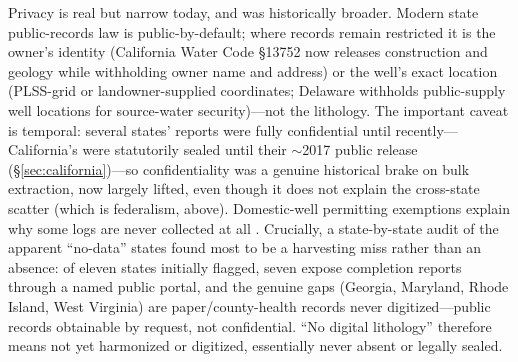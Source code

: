 \documentclass[12pt]{article}
\begin{document}
Privacy is real but narrow today, and was historically broader. Modern state public-records law is
public-by-default; where records remain restricted it is the owner's identity (California Water Code
\S13752 now releases construction and geology while withholding owner name and address) or the well's
exact location (PLSS-grid or landowner-supplied coordinates; Delaware withholds public-supply well
locations for source-water security)---not the lithology. The important caveat is temporal: several states'
reports were fully confidential until recently---California's were statutorily sealed until their
$\sim$2017 public release (§\ref{sec:california})---so confidentiality was a genuine historical brake
on bulk extraction, now largely lifted, even though it does not explain the cross-state scatter
(which is federalism, above). Domestic-well permitting exemptions explain why some logs are never collected at all
\citep{maxwell2019}. Crucially, a state-by-state audit of the apparent ``no-data'' states found most to be a
harvesting miss rather than an absence: of eleven states initially flagged, seven expose completion reports
through a named public portal, and the genuine gaps (Georgia, Maryland, Rhode Island, West Virginia) are
paper/county-health records never digitized---public records obtainable by request, not confidential.
``No digital lithology'' therefore means not yet harmonized or digitized, essentially never
absent or legally sealed.
\end{document}
